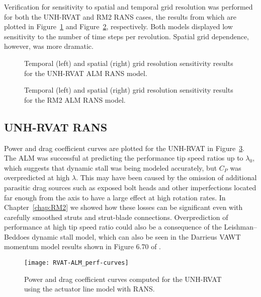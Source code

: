 Verification for sensitivity to spatial and temporal grid resolution was
performed for both the UNH-RVAT and RM2 RANS cases, the results from which are
plotted in Figure~\ref{fig:RVAT-ALM-verification} and
Figure~\ref{fig:RM2-ALM-verification}, respectively. Both models displayed low
sensitivity to the number of time steps per revolution. Spatial grid dependence,
however, was more dramatic.


\begin{figure}
    \centering
    
    \caption{Temporal (left) and spatial (right) grid resolution sensitivity
        results for the UNH-RVAT ALM RANS model.}
    
    \label{fig:RVAT-ALM-verification}
\end{figure}

\begin{figure}
    \centering
    
    \caption{Temporal (left) and spatial (right) grid resolution sensitivity
        results for the RM2 ALM RANS model.}
    
    \label{fig:RM2-ALM-verification}
\end{figure}


\subsection{UNH-RVAT RANS}

Power and drag coefficient curves are plotted for the UNH-RVAT in
Figure~\ref{fig:RVAT-ALM-perf-curves}. The ALM was successful at predicting the
performance tip speed ratios up to $\lambda_0$, which suggests that dynamic
stall was being modeled accurately, but $C_P$ was overpredicted at high
$\lambda$. This may have been caused by the omission of additional parasitic
drag sources such as exposed bolt heads and other imperfections located far
enough from the axis to have a large effect at high rotation rates. In
Chapter~\ref{chap:RM2} we showed how these losses can be significant even with
carefully smoothed struts and strut-blade connections. Overprediction of
performance at high tip speed ratio could also be a consequence of the
Leishman--Beddoes dynamic stall model, which can also be seen in the Darrieus
VAWT momentum model results shown in Figure 6.70 of \cite{Para2002}.

\begin{figure}
    \centering
    
    \texttt{[image: RVAT-ALM\_perf-curves]}
    
    \caption{Power and drag coefficient curves computed for the UNH-RVAT using
        the actuator line model with RANS.}
    
    \label{fig:RVAT-ALM-perf-curves}
\end{figure}


